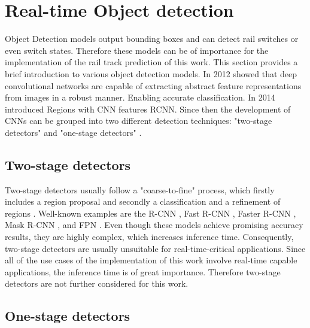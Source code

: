 \section{Real-time Object detection}
\label{sec:ObjectDetection}

Object Detection models output bounding boxes and can detect rail switches or even switch states.
Therefore these models can be of importance for the implementation of the rail track prediction of this work.
This section provides a brief introduction to various object detection models.
In 2012 \cite{AlexNet2012} showed that deep convolutional networks are capable of extracting abstract feature representations from images in a robust manner.
Enabling accurate classification.
In 2014 \cite{RCNN2014} introduced Regions with CNN features \ac{RCNN}.
Since then the development of CNNs can be grouped into two different detection techniques: "two-stage detectors" and "one-stage detectors" \cite{20yearsSurvey} \cite{surveyObjectDetection} \cite{surveyObjectDetection2019}.

\subsection{Two-stage detectors}

Two-stage detectors usually follow a "coarse-to-fine" process, which firstly includes a region proposal and secondly a classification and a refinement of regions \cite{20yearsSurvey} \cite{surveyObjectDetection} \cite{surveyObjectDetection2019} \cite{twostageObjectDetection}.
Well-known examples are the R-CNN \cite{RCNN2014}, Fast R-CNN \cite{FastRCNN2015}, Faster R-CNN \cite{FasterRCNN2017}, Mask R-CNN \cite{MaskRCNN2017}, and \ac{FPN} \cite{FPN2017_two_stage-detector}.
Even though these models achieve promising accuracy results, they are highly complex, which increases inference time.
Consequently, two-stage detectors are usually unsuitable for real-time-critical applications.
Since all of the use cases of the implementation of this work involve real-time capable applications, the inference time is of great importance.
Therefore two-stage detectors are not further considered for this work.

\subsection{One-stage detectors}

